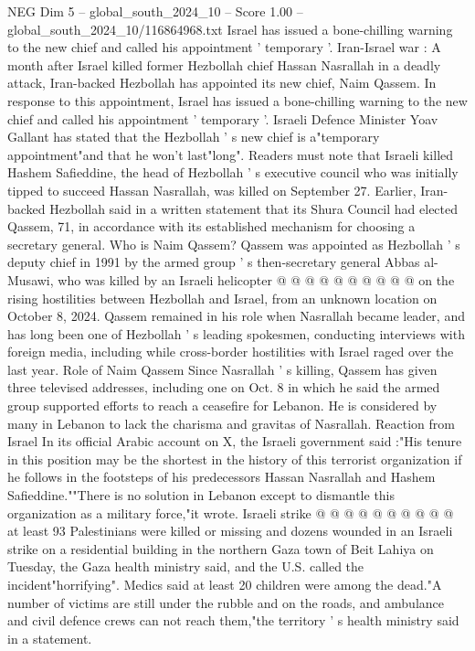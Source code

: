 \begin{textsample}{NEG Dim 5 – global\_south\_2024\_10 – Score 1.00 – global\_south\_2024\_10/116864968.txt}  \label{ex:f5_neg_101}
Israel has issued a bone-chilling warning to the new chief and called his appointment ' temporary '.
Iran-Israel war : A month after Israel killed former Hezbollah chief Hassan Nasrallah in a deadly attack, Iran-backed Hezbollah has appointed its new chief, Naim Qassem.
In response to this appointment, Israel has issued a bone-chilling warning to the new chief and called his appointment ' temporary '.
Israeli Defence Minister Yoav Gallant has stated that the Hezbollah ' s new chief is a"temporary appointment"and that he won't last"long".
Readers must note that Israeli killed Hashem Safieddine, the head of Hezbollah ' s executive council who was initially tipped to succeed Hassan Nasrallah, was killed on September 27.
Earlier, Iran-backed Hezbollah said in a written statement that its Shura Council had elected Qassem, 71, in accordance with its established mechanism for choosing a secretary general.
Who is Naim Qassem?
Qassem was appointed as Hezbollah ' s deputy chief in 1991 by the armed group ' s then-secretary general Abbas al-Musawi, who was killed by an Israeli helicopter @ @ @ @ @ @ @ @ @ @ on the rising hostilities between Hezbollah and Israel, from an unknown location on October 8, 2024.
Qassem remained in his role when Nasrallah became leader, and has long been one of Hezbollah ' s leading spokesmen, conducting interviews with foreign media, including while cross-border hostilities with Israel raged over the last year.
Role of Naim Qassem Since Nasrallah ' s killing, Qassem has given three televised addresses, including one on Oct. 8 in which he said the armed group supported efforts to reach a ceasefire for Lebanon.
He is considered by many in Lebanon to lack the charisma and gravitas of Nasrallah.
Reaction from Israel In its official Arabic account on X, the Israeli government said :"His tenure in this position may be the shortest in the history of this terrorist organization if he follows in the footsteps of his predecessors Hassan Nasrallah and Hashem Safieddine.""There is no solution in Lebanon except to dismantle this organization as a military force,"it wrote.
Israeli strike @ @ @ @ @ @ @ @ @ @ at least 93 Palestinians were killed or missing and dozens wounded in an Israeli strike on a residential building in the northern Gaza town of Beit Lahiya on Tuesday, the Gaza health ministry said, and the U.S. called the incident"horrifying".
Medics said at least 20 children were among the dead."A number of victims are still under the rubble and on the roads, and ambulance and civil defence crews can not reach them,"the territory ' s health ministry said in a statement.

\end{textsample}
